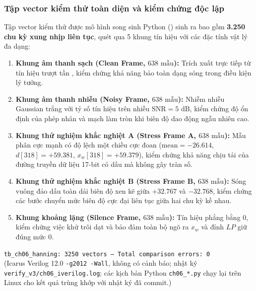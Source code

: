 \subsubsection*{Tập vector kiểm thử toàn diện và kiểm chứng độc lập}
Tập vector kiểm thử được mô hình song sinh Python () sinh ra bao gồm \textbf{3.250 chu kỳ xung nhịp liên tục}, quét qua 5 khung tín hiệu với các đặc tính vật lý đa dạng:
\begin{enumerate}[leftmargin=1.5em, itemsep=2pt]
    \item \textbf{Khung âm thanh sạch (Clean Frame, $638\text{ mẫu}$):} Trích xuất trực tiếp từ tín hiệu trượt tần , kiểm chứng khả năng bảo toàn dạng sóng trong điều kiện lý tưởng.
    \item \textbf{Khung âm thanh nhiễu (Noisy Frame, $638\text{ mẫu}$):} Nhiễm nhiễu Gaussian trắng với tỷ số tín hiệu trên nhiễu $\text{SNR} = 5\text{ dB}$, kiểm chứng độ ổn định của phép nhân và mạch làm tròn khi biên độ dao động ngẫu nhiên cao.
    \item \textbf{Khung thử nghiệm khắc nghiệt A (Stress Frame A, $638\text{ mẫu}$):} Mẫu phân cực mạnh có độ lệch một chiều cực đoan ($\text{mean} = -26.614$, $d[318] = +59.381$, $x_w[318] = +59.379$), kiểm chứng khả năng chịu tải của đường truyền dữ liệu 17-bit có dấu mà không gây tràn số.
    \item \textbf{Khung thử nghiệm khắc nghiệt B (Stress Frame B, $638\text{ mẫu}$):} Sóng vuông đảo dấu toàn dải biên độ xen kẽ giữa $+32.767$ và $-32.768$, kiểm chứng các bước chuyển mức biên độ cực đại liên tục giữa hai chu kỳ kề nhau.
    \item \textbf{Khung khoảng lặng (Silence Frame, $638\text{ mẫu}$):} Tín hiệu phẳng bằng 0, kiểm chứng việc khử trôi dạt và bảo đảm toàn bộ ngõ ra $x_w$ và đỉnh $LP$ giữ đúng mức 0.
\end{enumerate}

\begin{tcolorbox}[colback=yellow!10!white,colframe=yellow!50!black,title={Kết quả chạy Icarus Verilog chu kỳ-đối-chu kỳ (Reviewer)}]
\small\texttt{tb\_ch06\_hanning: 3250 vectors -- Total comparison errors: 0}\\
\footnotesize(Icarus Verilog 12.0 \texttt{-g2012 -Wall}, không có cảnh báo; nhật ký \texttt{verify\_v3/ch06\_iverilog.log}; các kịch bản Python \texttt{ch06\_*.py} chạy lại trên Linux cho kết quả trùng khớp với nhật ký đã commit.)
\end{tcolorbox}

